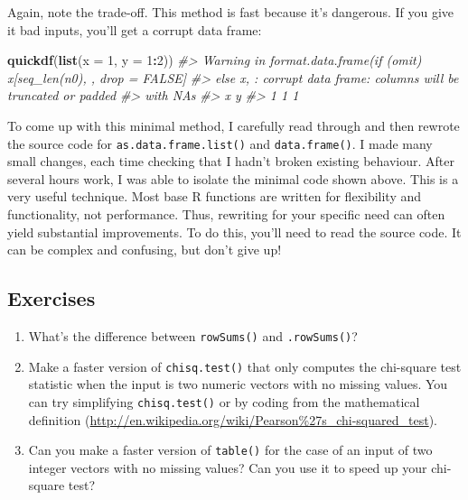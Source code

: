 \documentclass[]{book}
\newenvironment{Shaded}{\begin{snugshade}}{\end{snugshade}}
\newcommand{\CommentTok}[1]{\textcolor[rgb]{0.37,0.37,0.37}{\textit{#1}}}
\newcommand{\DataTypeTok}[1]{\textcolor[rgb]{0.27,0.27,0.27}{#1}}
\newcommand{\DecValTok}[1]{\textcolor[rgb]{0.06,0.06,0.06}{#1}}
\newcommand{\KeywordTok}[1]{\textcolor[rgb]{0.27,0.27,0.27}{\textbf{#1}}}
\newcommand{\NormalTok}[1]{#1}
\newcommand{\OperatorTok}[1]{\textcolor[rgb]{0.43,0.43,0.43}{\textbf{#1}}}
\renewcommand{\href}[2]{#2 (\url{#1})}
\begin{document}
Again, note the trade-off. This method is fast because it's dangerous. If you give it bad inputs, you'll get a corrupt data frame:

\begin{Shaded}
\begin{Highlighting}[]
\KeywordTok{quickdf}\NormalTok{(}\KeywordTok{list}\NormalTok{(}\DataTypeTok{x =} \DecValTok{1}\NormalTok{, }\DataTypeTok{y =} \DecValTok{1}\OperatorTok{:}\DecValTok{2}\NormalTok{))}
\CommentTok{#> Warning in format.data.frame(if (omit) x[seq_len(n0), , drop = FALSE]}
\CommentTok{#> else x, : corrupt data frame: columns will be truncated or padded}
\CommentTok{#> with NAs}
\CommentTok{#>   x y}
\CommentTok{#> 1 1 1}
\end{Highlighting}
\end{Shaded}

To come up with this minimal method, I carefully read through and then rewrote the source code for \texttt{as.data.frame.list()} and \texttt{data.frame()}. I made many small changes, each time checking that I hadn't broken existing behaviour. After several hours work, I was able to isolate the minimal code shown above. This is a very useful technique. Most base R functions are written for flexibility and functionality, not performance. Thus, rewriting for your specific need can often yield substantial improvements. To do this, you'll need to read the source code. It can be complex and confusing, but don't give up!

\hypertarget{exercises-19}{%
\subsection{Exercises}\label{exercises-19}}

\begin{enumerate}
\def\labelenumi{\arabic{enumi}.}
\item
  What's the difference between \texttt{rowSums()} and \texttt{.rowSums()}?
\item
  Make a faster version of \texttt{chisq.test()} that only computes the chi-square
  test statistic when the input is two numeric vectors with no missing
  values. You can try simplifying \texttt{chisq.test()} or by coding from the
  \href{http://en.wikipedia.org/wiki/Pearson\%27s_chi-squared_test}{mathematical definition}.
\item
  Can you make a faster version of \texttt{table()} for the case of an input of
  two integer vectors with no missing values? Can you use it to
  speed up your chi-square test?
\end{enumerate}
\end{document}
